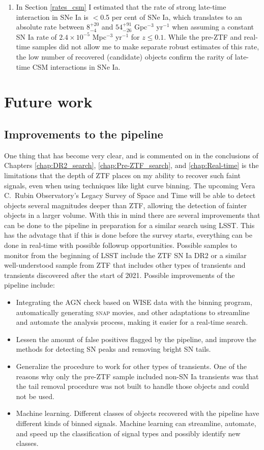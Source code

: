 \documentclass[a4paper,oneside,12pt, class=Latex/Classes/PhDthesisPSnPDF, crop=false]{standalone}
\begin{document}
\begin{enumerate}
	\item In Section \ref{rates_csm} I estimated that the rate of strong late-time interaction in SNe Ia is $<$0.5 per cent of SNe Ia, which translates to an absolute rate between $8_{-4}^{+20}$ and $54_{-26}^{+91}$ Gpc$^{-3}$ yr$^{-1}$ when assuming a constant SN Ia rate of $2.4\times10^{-5}$ Mpc$^{-3}$ yr$^{-1}$ for $z \leq 0.1$. While the pre-ZTF and real-time samples did not allow me to make separate robust estimates of this rate, the low number of recovered (candidate) objects confirm the rarity of late-time CSM interactions in SNe Ia.
\end{enumerate}


\section{Future work}
\subsection{Improvements to the pipeline}
One thing that has become very clear, and is commented on in the conclusions of Chapters \ref{chap:DR2_search}, \ref{chap:Pre-ZTF_search}, and \ref{chap:Real-time} is the limitations that the depth of ZTF places on my ability to recover such faint signals, even when using techniques like light curve binning. The upcoming Vera C.~Rubin Observatory's Legacy Survey of Space and Time \cite[LSST;][]{LSST} will be able to detect objects several magnitudes deeper than ZTF, allowing the detection of fainter objects in a larger volume. With this in mind there are several improvements that can be done to the pipeline in preparation for a similar search using LSST. This has the advatage that if this is done before the survey starts, everything can be done in real-time with possible followup opportunities. Possible samples to monitor from the beginning of LSST include the ZTF SN Ia DR2 or a similar well-understood sample from ZTF that includes other types of transients and transients discovered after the start of 2021. Possible improvements of the pipeline include:

\begin{itemize}
	\item Integrating the AGN check based on WISE data with the binning program, automatically generating \textsc{snap} movies, and other adaptations to streamline and automate the analysis process, making it easier for a real-time search.
	\item Lessen the amount of false positives flagged by the pipeline, and improve the methods for detecting SN peaks and removing bright SN tails.
	\item Generalize the procedure to work for other types of transients. One of the reasons why only the pre-ZTF sample included non-SN Ia transients was that the tail removal procedure was not built to handle those objects and could not be used.
	\item Machine learning. Different classes of objects recovered with the pipeline have different kinds of binned signals. Machine learning can streamline, automate, and speed up the classification of signal types and possibly identify new classes.
\end{itemize}
\end{document}
